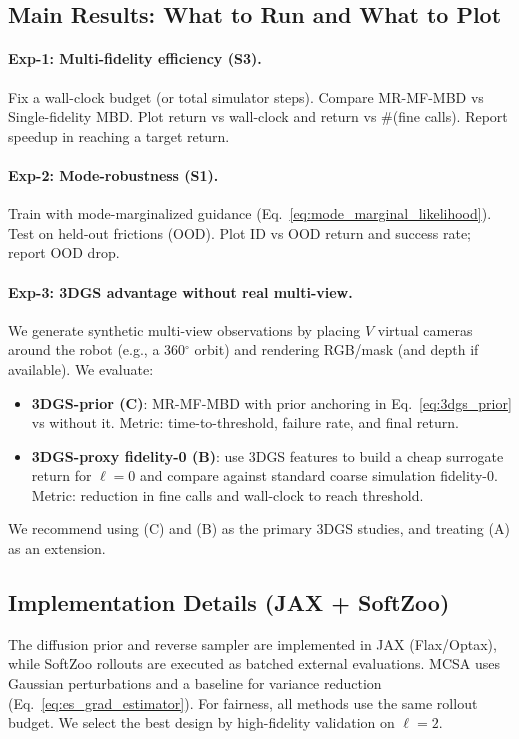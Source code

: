 \subsection{Main Results: What to Run and What to Plot}
\label{subsec:main_results}

\paragraph{Exp-1: Multi-fidelity efficiency (S3).}
Fix a wall-clock budget (or total simulator steps).
Compare MR-MF-MBD vs Single-fidelity MBD.
Plot return vs wall-clock and return vs \#(fine calls).
Report speedup in reaching a target return.

\paragraph{Exp-2: Mode-robustness (S1).}
Train with mode-marginalized guidance (Eq.~\eqref{eq:mode_marginal_likelihood}).
Test on held-out frictions (OOD).
Plot ID vs OOD return and success rate; report OOD drop.

\paragraph{Exp-3: 3DGS advantage without real multi-view.}
We generate synthetic multi-view observations by placing $V$ virtual cameras around the robot
(e.g., a 360$^\circ$ orbit) and rendering RGB/mask (and depth if available).
We evaluate:
\begin{itemize}
\item \textbf{3DGS-prior (C)}: MR-MF-MBD with prior anchoring in Eq.~\eqref{eq:3dgs_prior} vs without it.
Metric: time-to-threshold, failure rate, and final return.
\item \textbf{3DGS-proxy fidelity-0 (B)}: use 3DGS features to build a cheap surrogate return
for $\ell=0$ and compare against standard coarse simulation fidelity-0.
Metric: reduction in fine calls and wall-clock to reach threshold.
\end{itemize}
We recommend using (C) and (B) as the primary 3DGS studies, and treating (A) as an extension.

\subsection{Implementation Details (JAX + SoftZoo)}
\label{subsec:impl}

The diffusion prior and reverse sampler are implemented in JAX (Flax/Optax),
while SoftZoo rollouts are executed as batched external evaluations.
MCSA uses Gaussian perturbations and a baseline for variance reduction
(Eq.~\eqref{eq:es_grad_estimator}). For fairness, all methods use the same rollout budget.
We select the best design by high-fidelity validation on $\ell=2$.